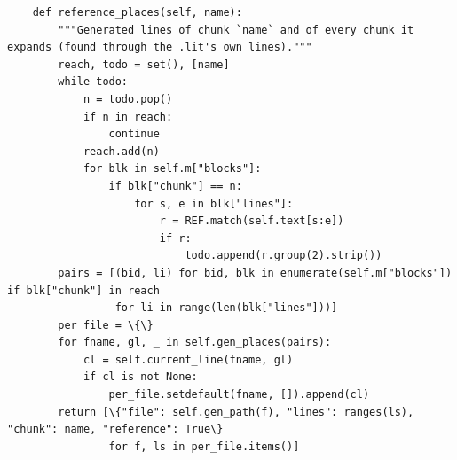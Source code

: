 \documentclass[10pt,a4paper]{article}
\newcounter{chunk}
\begin{document}
\begin{Verbatim}
    def reference_places(self, name):
        """Generated lines of chunk `name` and of every chunk it expands (found through the .lit's own lines)."""
        reach, todo = set(), [name]
        while todo:
            n = todo.pop()
            if n in reach:
                continue
            reach.add(n)
            for blk in self.m["blocks"]:
                if blk["chunk"] == n:
                    for s, e in blk["lines"]:
                        r = REF.match(self.text[s:e])
                        if r:
                            todo.append(r.group(2).strip())
        pairs = [(bid, li) for bid, blk in enumerate(self.m["blocks"]) if blk["chunk"] in reach
                 for li in range(len(blk["lines"]))]
        per_file = \{\}
        for fname, gl, _ in self.gen_places(pairs):
            cl = self.current_line(fname, gl)
            if cl is not None:
                per_file.setdefault(fname, []).append(cl)
        return [\{"file": self.gen_path(f), "lines": ranges(ls), "chunk": name, "reference": True\}
                for f, ls in per_file.items()]
\end{Verbatim}
\end{document}
